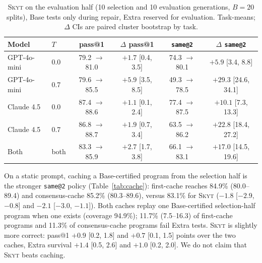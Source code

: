 \documentclass[acmsmall,screen,review,anonymous]{acmart}
\makeatletter
\newcommand{\skyt}{\textsc{Skyt}}
\newcommand{\sameat}{\mbox{\texttt{same@2}}}
\makeatother
\begin{document}
\begin{table}[t]
  \small
  \setlength{\tabcolsep}{3.5pt}
  \caption{\skyt{} on the evaluation half (10 selection and 10 evaluation
    generations, $B{=}20$ splits), Base tests only during repair, Extra reserved for evaluation.
    Task-means; $\Delta$ CIs are paired cluster bootstrap by task.}
  \label{tab:testhalf}
  \begin{tabular}{llcccc}
    \toprule
    Model & $T$ & pass@1 & $\Delta$ pass@1 & \sameat{} & $\Delta$ \sameat{} \\
    \midrule
    GPT-4o-mini & 0.0 & 79.2 $\to$ 81.0 & $+1.7$ [0.4, 3.5] & 74.3 $\to$ 80.1 & $+5.9$ [3.4, 8.8] \\
    GPT-4o-mini & 0.7 & 79.6 $\to$ 85.5 & $+5.9$ [3.5, 8.5] & 49.3 $\to$ 78.5 & $+29.3$ [24.6, 34.1] \\
    Claude 4.5 & 0.0 & 87.4 $\to$ 88.6 & $+1.1$ [0.1, 2.4] & 77.4 $\to$ 87.5 & $+10.1$ [7.3, 13.3] \\
    Claude 4.5 & 0.7 & 86.8 $\to$ 88.7 & $+1.9$ [0.7, 3.4] & 63.5 $\to$ 86.2 & $+22.8$ [18.4, 27.2] \\
    \midrule
    Both & both & 83.3 $\to$ 85.9 & $+2.7$ [1.7, 3.8] & 66.1 $\to$ 83.1 & $+17.0$ [14.5, 19.6] \\
    \bottomrule
  \end{tabular}
\end{table}

On a static prompt, caching a Base-certified program from the selection half is the stronger
\sameat{} policy (Table~\ref{tab:cache}): first-cache reaches 84.9\%
(80.0--89.4) and consensus-cache 85.2\% (80.3--89.6), versus 83.1\% for
\skyt{} ($-1.8$ [$-2.9$, $-0.8$] and $-2.1$ [$-3.0$, $-1.1$]).
Both caches replay one Base-certified selection-half program when one exists (coverage
94.9\%); 11.7\% (7.5--16.3) of first-cache programs and 11.3\% of consensus-cache programs fail Extra tests.
\skyt{} is slightly more correct: pass@1 $+0.9$ [0.2, 1.8] and $+0.7$
[0.1, 1.5] points over the two caches, Extra survival $+1.4$ [0.5, 2.6] and
$+1.0$ [0.2, 2.0].
We do not claim that \skyt{} beats caching.
\end{document}
